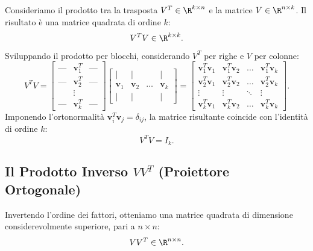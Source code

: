 Consideriamo il prodotto tra la trasposta $V^T \in \R^{k \times n}$ e la matrice $V \in \R^{n \times k}$. Il risultato \`e una matrice quadrata di ordine $k$:
\begin{equation}
    V^T V \in \R^{k \times k}.
\end{equation}
Sviluppando il prodotto per blocchi, considerando $V^T$ per righe e $V$ per colonne:
\begin{equation}
    V^T V = \begin{bmatrix} \text{---} & \mathbf{v}_1^T & \text{---} \\ \text{---} & \mathbf{v}_2^T & \text{---} \\ & \vdots & \\ \text{---} & \mathbf{v}_k^T & \text{---} \end{bmatrix} \begin{bmatrix} \mid & \mid & & \mid \\ \mathbf{v}_1 & \mathbf{v}_2 & \dots & \mathbf{v}_k \\ \mid & \mid & & \mid \end{bmatrix} = \begin{bmatrix} \mathbf{v}_1^T \mathbf{v}_1 & \mathbf{v}_1^T \mathbf{v}_2 & \dots & \mathbf{v}_1^T \mathbf{v}_k \\ \mathbf{v}_2^T \mathbf{v}_1 & \mathbf{v}_2^T \mathbf{v}_2 & \dots & \mathbf{v}_2^T \mathbf{v}_k \\ \vdots & \vdots & \ddots & \vdots \\ \mathbf{v}_k^T \mathbf{v}_1 & \mathbf{v}_k^T \mathbf{v}_2 & \dots & \mathbf{v}_k^T \mathbf{v}_k \end{bmatrix}.
\end{equation}
Imponendo l'ortonormalit\`a $\mathbf{v}_i^T \mathbf{v}_j = \delta_{ij}$, la matrice risultante coincide con l'identit\`a di ordine $k$:
\begin{equation}
    V^T V = I_k.
\end{equation}

\subsection{Il Prodotto Inverso \texorpdfstring{$V V^T$}{V V\textasciicircum T} (Proiettore Ortogonale)}

Invertendo l'ordine dei fattori, otteniamo una matrice quadrata di dimensione considerevolmente superiore, pari a $n \times n$:
\begin{equation}
    V V^T \in \R^{n \times n}.
\end{equation}


